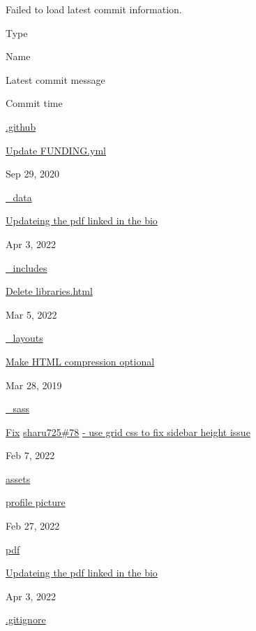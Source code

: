 \documentclass[english,]{article}
\begin{document}
Failed to load latest commit information.

Type

Name

Latest commit message

Commit time

{\href{/alexpoulis/online-cv/tree/master/.github}{.github}}

{
\href{/alexpoulis/online-cv/commit/f1ce335b16fb6727da955eb146a2651569bfe40b}{Update
FUNDING.yml} }

Sep 29, 2020

{\href{/alexpoulis/online-cv/tree/master/_data}{\_data}}

{
\href{/alexpoulis/online-cv/commit/36f3fb031b223afbc7664fa130ea815e07db1586}{Updateing
the pdf linked in the bio} }

Apr 3, 2022

{\href{/alexpoulis/online-cv/tree/master/_includes}{\_includes}}

{
\href{/alexpoulis/online-cv/commit/4bca7087371949ae025ac25cd9245b144660663b}{Delete
libraries.html} }

Mar 5, 2022

{\href{/alexpoulis/online-cv/tree/master/_layouts}{\_layouts}}

{
\href{/alexpoulis/online-cv/commit/f1dbf72d7034c97290dc74e19cf6674ed6941bce}{Make
HTML compression optional} }

Mar 28, 2019

{\href{/alexpoulis/online-cv/tree/master/_sass}{\_sass}}

{
{\href{/alexpoulis/online-cv/commit/a2cdb2a50d24df4b80c90e1ce45aa47ebd1daece}{Fix}}
\href{https://github.com/sharu725/online-cv/issues/78}{sharu725\#78}
\href{/alexpoulis/online-cv/commit/a2cdb2a50d24df4b80c90e1ce45aa47ebd1daece}{-
use grid css to fix sidebar height issue} }

Feb 7, 2022

{\href{/alexpoulis/online-cv/tree/master/assets}{assets}}

{
\href{/alexpoulis/online-cv/commit/1ee0ff059a94ebd095bd36b57d6363c86ada4f99}{profile
picture} }

Feb 27, 2022

{\href{/alexpoulis/online-cv/tree/master/pdf}{pdf}}

{
\href{/alexpoulis/online-cv/commit/36f3fb031b223afbc7664fa130ea815e07db1586}{Updateing
the pdf linked in the bio} }

Apr 3, 2022

{\href{/alexpoulis/online-cv/blob/master/.gitignore}{.gitignore}}
\end{document}
